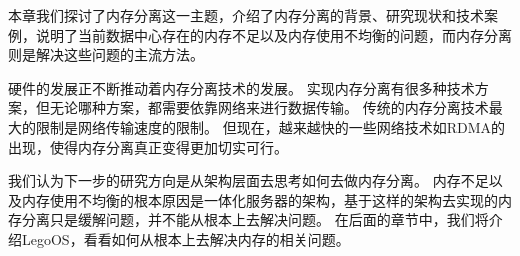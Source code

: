 本章我们探讨了内存分离这一主题，介绍了内存分离的背景、研究现状和技术案例，说明了当前数据中心存在的内存不足以及内存使用不均衡的问题，而内存分离则是解决这些问题的主流方法。

硬件的发展正不断推动着内存分离技术的发展。
实现内存分离有很多种技术方案，但无论哪种方案，都需要依靠网络来进行数据传输。
传统的内存分离技术最大的限制是网络传输速度的限制。
但现在，越来越快的一些网络技术如RDMA的出现，使得内存分离真正变得更加切实可行。

我们认为下一步的研究方向是从架构层面去思考如何去做内存分离。
内存不足以及内存使用不均衡的根本原因是一体化服务器的架构，基于这样的架构去实现的内存分离只是缓解问题，并不能从根本上去解决问题。
在后面的章节中，我们将介绍LegoOS，看看如何从根本上去解决内存的相关问题。

